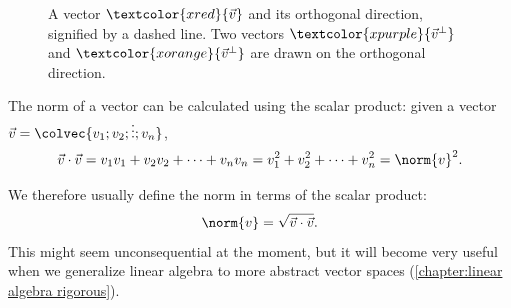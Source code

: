 \begin{figure}
	\centering
	\caption{A vector $\textcolor{xred}{\vec{v}}$ and its orthogonal direction, signified by a dashed line. Two vectors $\textcolor{xpurple}{\vec{v}^{\perp}}$ and $\textcolor{xorange}{\vec{v}^{\perp}}$ are drawn on the orthogonal direction.}
	\label{fig:R2_ortho}
\end{figure}

The norm of a vector can be calculated using the scalar product: given a vector $\vec{v}=\colvec{v_{1};v_{2};\vdots;v_{n}}$,
\begin{equation}
	\vec{v}\cdot\vec{v} = v_{1}v_{1} + v_{2}v_{2} + \cdots + v_{n}v_{n} = v_{1}^{2} + v_{2}^{2} + \cdots + v_{n}^{2} = \norm{v}^{2}.
	\label{eq:scalar product to norm}
\end{equation}

We therefore usually define the norm in terms of the scalar product:
\begin{equation}
	\norm{v} = \sqrt{\vec{v}\cdot\vec{v}}.
	\label{eq:norm from scalar product}
\end{equation}
This might seem unconsequential at the moment, but it will become very useful when we generalize linear algebra to more abstract vector spaces (\autoref{chapter:linear algebra rigorous}).

